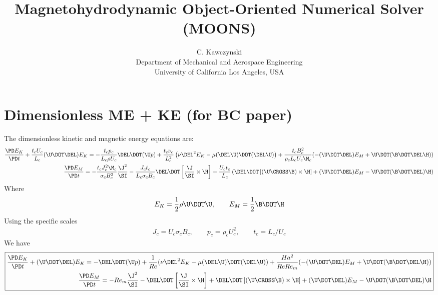 \documentclass[11pt]{article}
\begin{document}
\doublespacing
\title{Magnetohydrodynamic Object-Oriented Numerical Solver (MOONS)}
\author{C. Kawczynski \\
Department of Mechanical and Aerospace Engineering \\
University of California Los Angeles, USA\\
}
\maketitle

\section{Dimensionless ME + KE (for BC paper)}
The dimensionless kinetic and magnetic energy equations are:
\begin{equation}\begin{aligned}
	\frac{\PD E_K}{\PD t}
	+ \frac{t_c U_c}{L_c} (\U \DOT \DEL) E_K
	= 
	- \frac{t_c p_c}{L_c \rho U_c} \DEL \DOT (\U p)
	+ \frac{t_c \nu_c}{L_c^2}
	\left( \nu \DEL^2 E_K -  \mu (\DEL \U) \DOT (\DEL \U) \right)
	+ \frac{t_c B_c^2}{\rho_c L_c U_c \M_c}
	( - (\U \DOT \DEL) E_M + \U \DOT (\B \DOT \DEL \H) ) \\
	\frac{\PD E_M}{\PD t} = 
	- \frac{t_c J_c^2 \M_c}{\sigma_c B_c^2} \frac{\J^2}{\SI}
	- \frac{J_c t_c}{L_c \sigma_c B_c} \DEL \DOT \left[\frac{\J}{\SI} \times \H \right]
	+ \frac{U_c t_c}{L_c}
	\left( 
	\DEL \DOT \left[\left(\U \CROSS \B \right) \times \H \right]
	+ (\U \DOT \DEL) E_M
	- \U \DOT (\B \DOT \DEL) \H
	\right)
\end{aligned}\end{equation}
Where
\begin{equation}
	E_K = \frac{1}{2} \rho \U \DOT \U, \qquad E_M = \frac{1}{2} \B \DOT \H
\end{equation}
Using the specific scales
\begin{equation}\begin{aligned}
	J_c = U_c \sigma_c B_c, \qquad
	p_c = \rho_c U_c^2, \qquad
	t_c = L_c / U_c
\end{aligned}\end{equation}
We have
\begin{equation}\boxed{\begin{aligned}
	\frac{\PD E_K}{\PD t}
	+ (\U \DOT \DEL) E_K
	= 
	- \DEL \DOT (\U p)
	+ \frac{1}{Re} ( \nu \DEL^2 E_K -  \mu (\DEL \U) \DOT (\DEL \U) )
	+ \frac{Ha^2}{Re Re_m} (  - (\U \DOT \DEL) E_M + \U \DOT (\B \DOT \DEL \H) )
	\\
	\frac{\PD E_M}{\PD t} = 
	- Re_m \frac{\J^2}{\SI}
	- \DEL \DOT \left[\frac{\J}{\SI} \times \H \right]
	+ 
	\DEL \DOT \left[\left(\U \CROSS \B \right) \times \H \right]
	+ (\U \DOT \DEL) E_M - \U \DOT (\B \DOT \DEL) \H
\end{aligned}}\end{equation}
\end{document}

